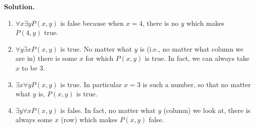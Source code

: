 \documentclass[10pt,]{book}
\theoremstyle{plain}
\theoremstyle{definition}
\theoremstyle{definition}
\numberwithin{equation}{chapter}
\begin{document}
\begin{exerciselist}
%
\par
\medskip\noindent%
\textbf{Solution.}\quad \hypertarget{p-278}{}%
\leavevmode%
\begin{enumerate}[label=(\alph*)]
\item\hypertarget{li-145}{}\hypertarget{p-279}{}%
\(\forall x \exists y P(x,y)\) is false because when \(x = 4\), there is no \(y\) which makes \(P(4,y)\) true.%
\item\hypertarget{li-146}{}\hypertarget{p-280}{}%
\(\forall y \exists x P(x,y)\) is true.  No matter what \(y\) is (i.e., no matter what column we are in) there is some \(x\) for which \(P(x,y)\) is true.  In fact, we can always take \(x\) to be \(3\).%
\item\hypertarget{li-147}{}\hypertarget{p-281}{}%
\(\exists x \forall y P(x,y)\) is true. In particular \(x=3\) is such a number, so that no matter what \(y\) is, \(P(x,y)\) is true.%
\item\hypertarget{li-148}{}\hypertarget{p-282}{}%
\(\exists y \forall x P(x,y)\) is false. In fact, no matter what \(y\) (column) we look at, there is always some \(x\) (row) which makes \(P(x,y)\) false.%
\end{enumerate}
%
\par
\end{exerciselist}
\typeout{************************************************}
\typeout{************************************************}
\end{document}
